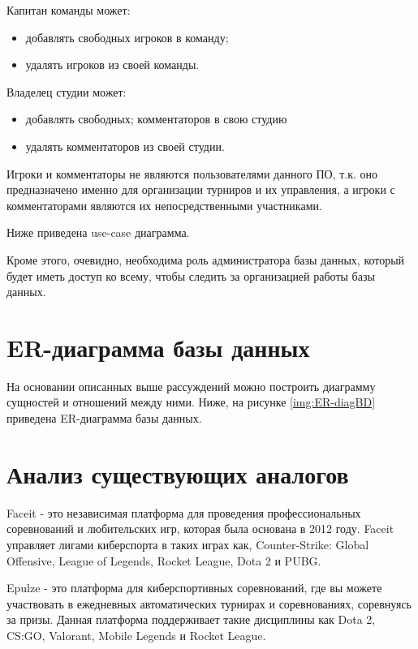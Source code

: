 Капитан команды может:
\begin{itemize}
	\item добавлять свободных игроков в команду;
	\item удалять игроков из своей команды.
\end{itemize}

Владелец студии может:
\begin{itemize}
	\item добавлять свободных; комментаторов в свою студию
	\item удалять комментаторов из своей студии.
\end{itemize}

Игроки и комментаторы не являются пользователями данного ПО, т.к. оно предназначено именно для организации турниров и их управления, а игроки с комментаторами являются их непосредственными участниками.

\newpage
Ниже приведена use-case диаграмма.

Кроме этого, очевидно, необходима роль администратора базы данных, который будет иметь доступ ко всему, чтобы следить за организацией работы базы данных.

\newpage
\section{ER-диаграмма базы данных}
На основании описанных выше рассуждений можно построить диаграмму сущностей и отношений между ними. Ниже, на рисунке \ref{img:ER-diagBD} приведена ER-диаграмма базы данных.


\section{Анализ существующих аналогов}


Faceit - это независимая платформа для проведения профессиональных соревнований и любительских игр, которая была основана в 2012 году. Faceit управляет лигами киберспорта в таких играх как, Counter-Strike: Global Offensive, League of Legends, Rocket League, Dota 2 и PUBG.


Epulze - это платформа для киберспортивных соревнований, где вы можете участвовать в ежедневных автоматических турнирах и соревнованиях, соревнуясь за призы. Данная платформа поддерживает такие дисциплины как Dota 2, CS:GO, Valorant, Mobile Legends и Rocket League.

